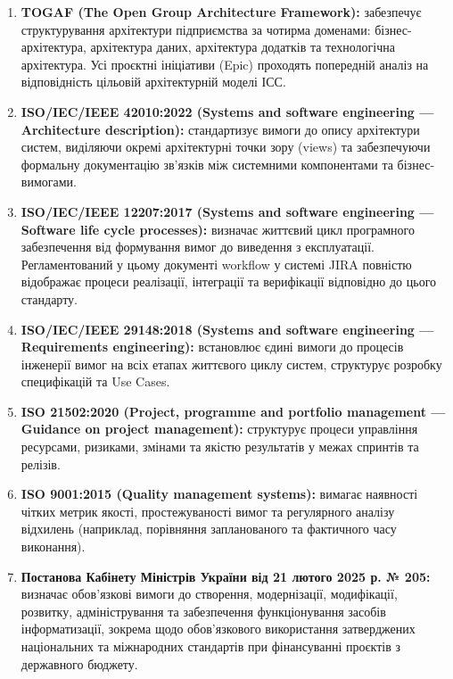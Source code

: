 \documentclass{article}
\begin{document}
\begin{enumerate}
    \item \textbf{TOGAF (The Open Group Architecture Framework):} забезпечує структурування архітектури підприємства за чотирма доменами: бізнес-архітектура, архітектура даних, архітектура додатків та технологічна архітектура. Усі проєктні ініціативи (Epic) проходять попередній аналіз на відповідність цільовій архітектурній моделі ІСС.
    \item \textbf{ISO/IEC/IEEE 42010:2022 (Systems and software engineering --- Architecture description):} стандартизує вимоги до опису архітектури систем, виділяючи окремі архітектурні точки зору (views) та забезпечуючи формальну документацію зв'язків між системними компонентами та бізнес-вимогами.
    \item \textbf{ISO/IEC/IEEE 12207:2017 (Systems and software engineering --- Software life cycle processes):} визначає життєвий цикл програмного забезпечення від формування вимог до виведення з експлуатації. Регламентований у цьому документі workflow у системі JIRA повністю відображає процеси реалізації, інтеграції та верифікації відповідно до цього стандарту.
    \item \textbf{ISO/IEC/IEEE 29148:2018 (Systems and software engineering --- Requirements engineering):} встановлює єдині вимоги до процесів інженерії вимог на всіх етапах життєвого циклу систем, структурує розробку специфікацій та Use Cases.
    \item \textbf{ISO 21502:2020 (Project, programme and portfolio management --- Guidance on project management):} структурує процеси управління ресурсами, ризиками, змінами та якістю результатів у межах спринтів та релізів.
    \item \textbf{ISO 9001:2015 (Quality management systems):} вимагає наявності чітких метрик якості, простежуваності вимог та регулярного аналізу відхилень (наприклад, порівняння запланованого та фактичного часу виконання).
    \item \textbf{Постанова Кабінету Міністрів України від 21 лютого 2025 р. № 205:} визначає обов'язкові вимоги до створення, модернізації, модифікації, розвитку, адміністрування та забезпечення функціонування засобів інформатизації, зокрема щодо обов'язкового використання затверджених національних та міжнародних стандартів при фінансуванні проєктів з державного бюджету.
\end{enumerate}
\end{document}
